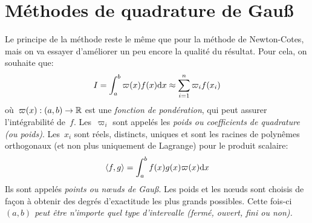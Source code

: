 \section{Méthodes de quadrature de Gauß} 
Le principe de la méthode reste le même que pour la méthode de Newton-Cotes, mais on va essayer d'améliorer un peu encore la qualité du résultat. Pour cela, on souhaite que: 
\begin{equation}
I=\int_a^b \varpi(x)f(x)\text{d} x \approx \sum_{i=1}^n \varpi_if(x_i)
\end{equation}
où~$\varpi(x): (a,b)\rightarrow\mathbb R$ est une \emph{fonction de pondération}, qui peut assurer l'intégrabilité de~$f$. Les~$\varpi_i$ sont appelés les \emph{poids ou coefficients de quadrature (ou poids)}. Les~$x_i$ sont réels, distincts, uniques et sont les racines de polynêmes orthogonaux (et non plus uniquement de Lagrange) pour le produit scalaire:
\begin{equation}
\left\langle f,g \right\rangle = \int_a^b f(x)g(x) \varpi(x) \text{d} x
\end{equation}
Ils sont appelés \emph{points ou nœuds de Gauß}. Les poids et les nœuds sont choisis de façon à obtenir des degrés d'exactitude les plus grands possibles. Cette fois-ci \emph{$(a,b)$ peut être n'importe quel type d'intervalle (fermé, ouvert, fini ou non).} 

